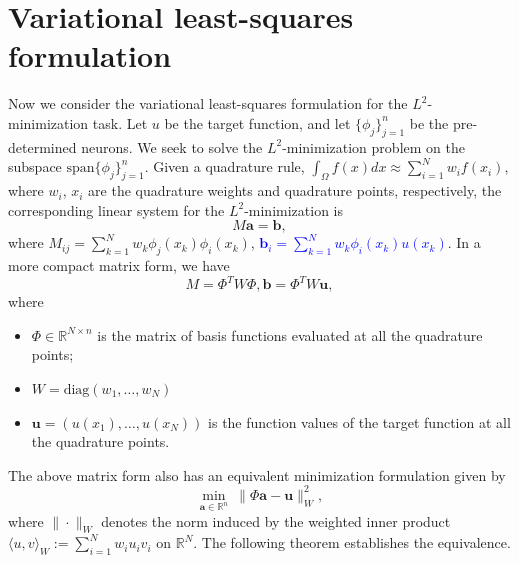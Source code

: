 \documentclass{article}
\theoremstyle{remark}
\begin{document}
\section{Variational least-squares formulation}
\label{app:least-square}

Now we consider the variational least-squares formulation for the $L^2$-minimization task.
Let $u$ be the target function, and let $\{ \phi_j \}_{j = 1}^n$ be the pre-determined neurons. 
We seek to solve the $L^2$-minimization problem on the subspace $\text{span}\{  \phi_j \}_{j = 1}^n$. 
Given a quadrature rule, $\int_{\Omega} f(x) dx \approx \sum_{i =1}^N w_i f(x_i)$, where $w_i$, $x_i$ are the quadrature weights and quadrature points, respectively,  the corresponding linear system for the $L^2$-minimization is
\begin{equation}
    M \mathbf{a} = \mathbf{b}, 
\end{equation}
where $M_{ij}= \sum_{k = 1}^N w_k \phi_j(x_k)  \phi_i(x_k)$, \textcolor{blue}{$\mathbf{b}_i = \sum_{k = 1}^N w_k \phi_i(x_k) u(x_k) $}.
In a more compact matrix form, we have 
\begin{equation}
    M = \Phi^T W \Phi, \mathbf{b} = \Phi^T W \mathbf{u},  
\end{equation}
where
\begin{itemize}
    \item $\Phi \in \mathbb{R}^{N\times n}$ is the matrix of basis functions evaluated at all the quadrature points;
    \item $W = \text{diag}(w_1,\dots,w_N)$
    \item $\mathbf{u} = (u(x_1), \dots, u(x_N)) $ is the function values of the target function at all the quadrature points. 
\end{itemize} 
The above matrix form also has an equivalent minimization formulation given by 
\begin{equation}
    \min_{\mathbf{a} \in \mathbb{R}^n} \ \| \Phi \mathbf{a} - \mathbf{u} \|_{W}^2,
\end{equation}
where $\| \cdot\|_W$ denotes the norm induced by the weighted inner product $\langle u,v \rangle_W := \sum_{i = 1}^N w_i u_i v_i$ on $\mathbb{R}^N$. 
The following theorem establishes the equivalence.
\end{document}
